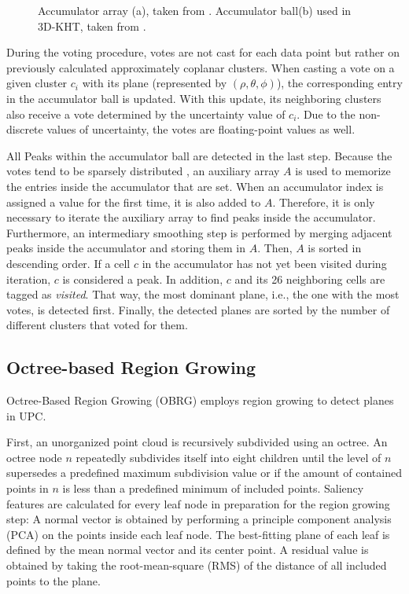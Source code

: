 \documentclass[main.tex]{subfiles}
\begin{document}
\begin{figure}[H]
\begin{subfigure}{0.25\textwidth}
        \caption[3D-KHT Accumulator Ball]{}
        \label{fig:accball}
    \end{subfigure}
    \hspace{\fill}
    \caption[Hough Transform Accumulators]{Accumulator array (a), taken from \cite*[Figure~3]{Borrmann_Elseberg_Lingemann_Nüchter_2011}. Accumulator
        ball(b) used in 3D-KHT, taken from \cite*[Figure~5]{LimbergerOliveira2015HT3D}.}
\end{figure}

During the voting procedure, votes are not cast for each data point but rather on previously calculated approximately coplanar clusters.
When casting a vote on a given cluster $c_i$ with its plane (represented by $(\rho, \theta, \phi)$), the corresponding entry in the accumulator ball is updated.
With this update, its neighboring clusters also receive a vote determined by the uncertainty value of $c_i$. Due to the non-discrete
values of uncertainty, the votes are floating-point values as well.

All Peaks within the accumulator ball are detected in the last step. Because the votes tend to be sparsely distributed \cite[Section~3.4]{LimbergerOliveira2015HT3D},
an auxiliary array $A$ is used to memorize the entries inside the accumulator that are set. When an accumulator index is assigned a value for the first time, it is also added to $A$.
Therefore, it is only necessary to iterate the auxiliary array to find peaks inside the accumulator.
Furthermore, an intermediary smoothing step is performed by merging adjacent peaks inside the accumulator and storing them in $A$.
Then, $A$ is sorted in descending order.
If a cell $c$ in the accumulator has not yet been visited during iteration, $c$ is considered a peak. In addition, $c$ and its 26 neighboring cells are tagged as \textit{visited}.
That way, the most dominant plane, i.e., the one with the most votes, is detected first.
Finally, the detected planes are sorted by the number of different clusters that voted for them.

\subsection{Octree-based Region Growing}
\label{subsec:bg-obrg}
Octree-Based Region Growing (OBRG) \cite{Vo_Truong-Hong_Laefer_Bertolotto_2015} employs region growing to detect planes in UPC.

First, an unorganized point cloud is recursively subdivided using an octree.
An octree node $n$ repeatedly subdivides itself into eight children until the level of $n$ supersedes a predefined maximum subdivision value or if the
amount of contained points in $n$ is less than a predefined minimum of included points. 
Saliency features are calculated for every leaf node in preparation for the region growing step: A normal vector is obtained by performing a principle
component analysis (PCA) on the points inside each leaf node. The best-fitting plane of each leaf is defined by the mean normal vector and its center point.
A residual value is obtained by taking the root-mean-square (RMS) of the distance of all included points to the plane.
\end{document}
